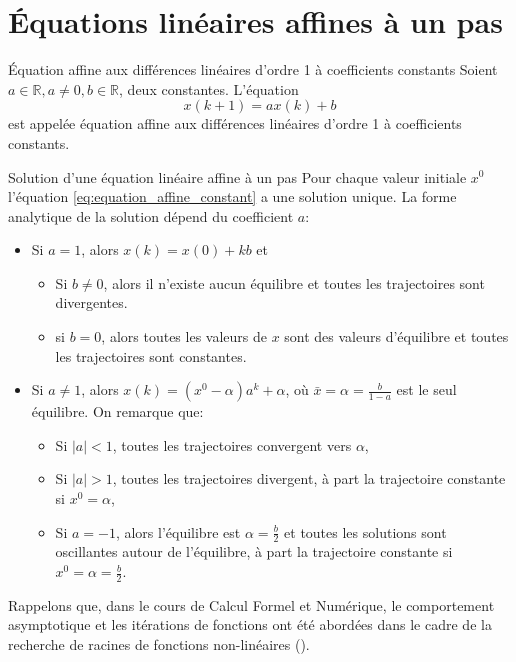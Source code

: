     \section{Équations linéaires affines à un pas}
        \begin{definition}{Équation affine aux différences linéaires d'ordre 1 à coefficients constants}
            Soient $a\in \mathbb{R}, a\neq 0, b\in \mathbb{R}$, deux constantes. L'équation
            \begin{equation}\label{eq:equation_affine_constant}
                x(k+1) = ax(k)+b
            \end{equation}
            est appelée équation affine aux différences linéaires d'ordre 1 à coefficients constants.
        \end{definition}
        \begin{theorem}{Solution d'une équation linéaire affine à un pas}
            Pour chaque valeur initiale $x^0$ l’équation \ref{eq:equation_affine_constant} a une solution unique. La forme analytique de la solution dépend du coefficient $a$:
            \begin{itemize}
                \item Si $a=1$, alors $x(k) = x(0) + kb$ et
                \begin{itemize}
                    \item Si $b\neq 0$, alors il n’existe aucun équilibre et toutes les trajectoires sont divergentes.
                    \item si $b=0$, alors toutes les valeurs de $x$ sont des valeurs d’équilibre et toutes les trajectoires sont constantes.
                \end{itemize}
                \item Si $a\neq 1$, alors $x(k)=(x^0-\alpha)a^k + \alpha$, où $\bar{x} = \alpha = \frac{b}{1-a}$ est le seul équilibre. On remarque que:
                \begin{itemize}
                    \item Si $|a|<1$, toutes les trajectoires convergent vers $\alpha$,
                    \item Si $|a|>1$, toutes les trajectoires divergent, à part la trajectoire constante si $x^0=\alpha$,
                    \item Si $a=-1$, alors l'équilibre est $\alpha=\frac{b}{2}$ et toutes les solutions sont oscillantes autour de l'équilibre, à part la trajectoire constante si $x^0=\alpha=\frac{b}{2}$.
                \end{itemize}
            \end{itemize}
        \end{theorem}
        Rappelons que, dans le cours de Calcul Formel et Numérique, le comportement asymptotique et les itérations de fonctions ont été abordées dans le cadre de la recherche de racines de fonctions non-linéaires (\cite{infof205}).
        
